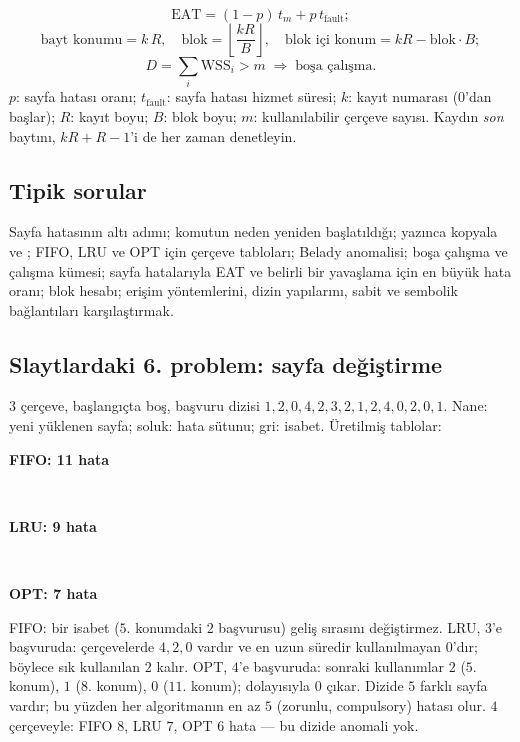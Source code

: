 \begin{keyidea}
\[
\text{EAT} = (1-p)\,t_m + p\,t_{\text{fault}};
\]
\[
\text{bayt konumu} = k\,R, \quad \text{blok} = \left\lfloor \frac{kR}{B} \right\rfloor, \quad \text{blok içi konum} = kR - \text{blok}\cdot B;
\]
\[
D = \sum_i \text{WSS}_i > m \;\Rightarrow\; \text{boşa çalışma}.
\]
$p$: sayfa hatası oranı; $t_{\text{fault}}$: sayfa hatası hizmet süresi; $k$: kayıt numarası ($0$'dan başlar); $R$: kayıt boyu; $B$: blok boyu; $m$: kullanılabilir çerçeve sayısı. Kaydın \emph{son} baytını, $kR + R - 1$'i de her zaman denetleyin.
\end{keyidea}

\subsection*{Tipik sorular}
Sayfa hatasının altı adımı; komutun neden yeniden başlatıldığı; yazınca kopyala ve ; FIFO, LRU ve OPT için çerçeve tabloları; Belady anomalisi; boşa çalışma ve çalışma kümesi; sayfa hatalarıyla EAT ve belirli bir yavaşlama için en büyük hata oranı; blok hesabı; erişim yöntemlerini, dizin yapılarını, sabit ve sembolik bağlantıları karşılaştırmak.

\subsection{Slaytlardaki 6. problem: sayfa değiştirme}
$3$ çerçeve, başlangıçta boş, başvuru dizisi $1, 2, 0, 4, 2, 3, 2, 1, 2, 4, 0, 2, 0, 1$. Nane: yeni yüklenen sayfa; soluk: hata sütunu; gri: isabet. Üretilmiş tablolar:

\begin{center}
\begin{minipage}{\linewidth}\centering\textbf{FIFO: 11 hata}\\[0.2em]\end{minipage}\\[0.8em]
\begin{minipage}{\linewidth}\centering\textbf{LRU: 9 hata}\\[0.2em]\end{minipage}\\[0.8em]
\begin{minipage}{\linewidth}\centering\textbf{OPT: 7 hata}\\[0.2em]\end{minipage}
\end{center}
FIFO: bir isabet ($5$. konumdaki $2$ başvurusu) geliş sırasını değiştirmez. LRU, $3$'e başvuruda: çerçevelerde $4, 2, 0$ vardır ve en uzun süredir kullanılmayan $0$'dır; böylece sık kullanılan $2$ kalır. OPT, $4$'e başvuruda: sonraki kullanımlar $2$ ($5$. konum), $1$ ($8$. konum), $0$ ($11$. konum); dolayısıyla $0$ çıkar. Dizide $5$ farklı sayfa vardır; bu yüzden her algoritmanın en az $5$ (zorunlu, compulsory) hatası olur. $4$ çerçeveyle: FIFO $8$, LRU $7$, OPT $6$ hata --- bu dizide anomali yok.

